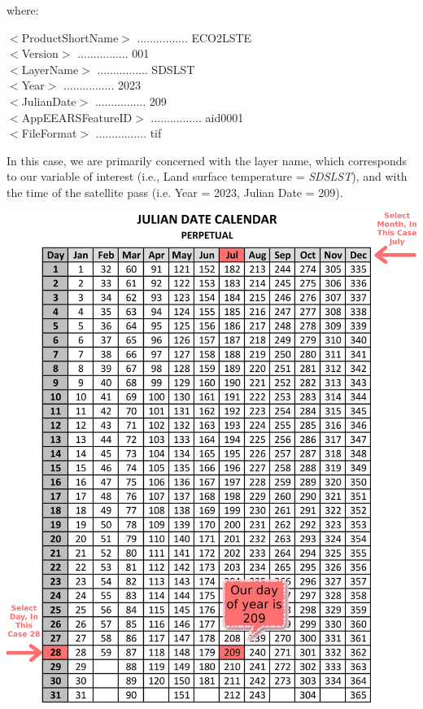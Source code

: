 \documentclass[oneside,a4paper,11pt,explicit]{book}
\begin{document}
where: 

    $<$ProductShortName$>$ ................ ECO2LSTE \\
    $<$Version$>$ ................ 001  \\
    $<$LayerName$>$ ................ SDS\textunderscore LST \\
    $<$Year$>$ ................ 2023  \\
    $<$JulianDate$>$ ................ 209  \\
    $<$AppEEARSFeatureID$>$ ................ aid0001 \\
    $<$FileFormat$>$ ................ tif

\vspace{.5em}

In this case, we are primarily concerned with the layer name, which corresponds to our variable of interest (i.e., Land surface temperature = \textit{SDS\textunderscore LST}), and with the time of the satellite pass (i.e. Year = 2023, Julian Date = 209).

\centerline{\includegraphics[width=.9\textwidth]{Julian209.png}}

\end{document}
